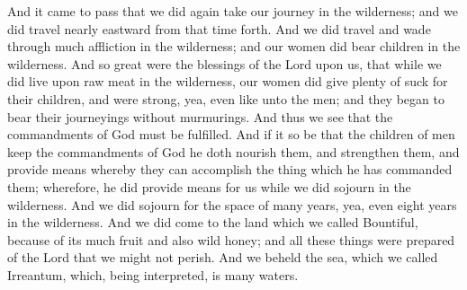 \bchapter
\bverse \iffalse And it came to pass that we did again take our journey in the wilderness; and we did travel nearly eastward from that time forth. And we did travel and wade through much affliction in the wilderness; and our women did bear children in the wilderness. \fi
And it came to pass that we did again take our journey in the wilderness; and we did travel nearly eastward from that time forth. And we did travel and wade through much affliction in the wilderness; and our women did bear children in the wilderness.
\bverse \iffalse And so great were the blessings of the Lord upon us, that while we did live upon raw meat in the wilderness, our women did give plenty of suck for their children, and were strong, yea, even like unto the men; and they began to bear their journeyings without murmurings. \fi
And so great were the blessings of the Lord upon us, that while we did live upon raw meat in the wilderness, our women did give plenty of suck for their children, and were strong, yea, even like unto the men; and they began to bear their journeyings without murmurings.
\bverse \iffalse And thus we see that the commandments of God must be fulfilled. And if it so be that the children of men keep the commandments of God he doth nourish them, and strengthen them, and provide means whereby they can accomplish the thing which he has commanded them; wherefore, he did provide means for us while we did sojourn in the wilderness. \fi
And thus we see that the commandments of God must be fulfilled. And if it so be that the children of men keep the commandments of God he doth nourish them, and strengthen them, and provide means whereby they can accomplish the thing which he has commanded them; wherefore, he did provide means for us while we did sojourn in the wilderness.
\bverse \iffalse And we did sojourn for the space of many years, yea, even eight years in the wilderness. \fi
And we did sojourn for the space of many years, yea, even eight years in the wilderness.
\bverse \iffalse And we did come to the land which we called Bountiful, because of its much fruit and also wild honey; and all these things were prepared of the Lord that we might not perish. And we beheld the sea, which we called Irreantum, which, being interpreted, is many waters. \fi
And we did come to the land which we called Bountiful, because of its much fruit and also wild honey; and all these things were prepared of the Lord that we might not perish. And we beheld the sea, which we called Irreantum, which, being interpreted, is many waters.
